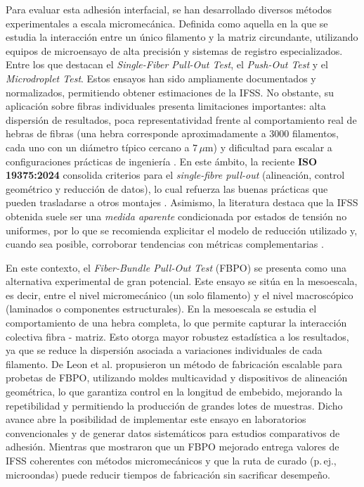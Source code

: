Para evaluar esta adhesión interfacial, se han desarrollado diversos métodos experimentales
a escala micromecánica. Definida como aquella en la que se estudia la interacción entre un
único filamento y la matriz circundante, utilizando equipos de microensayo de alta precisión
y sistemas de registro especializados. Entre los que destacan el \textit{Single-Fiber Pull-Out Test},
el \textit{Push-Out Test} y el \textit{Microdroplet Test}. Estos ensayos han sido ampliamente
documentados y normalizados, permitiendo obtener estimaciones de la IFSS. No obstante, su aplicación
sobre fibras individuales presenta limitaciones importantes: alta dispersión de resultados, poca
representatividad frente al comportamiento real de hebras de fibras (una hebra corresponde
aproximadamente a 3000 filamentos, cada uno con un diámetro típico cercano a $7\,\mu$m) y dificultad
para escalar a configuraciones prácticas de ingeniería \cite{DINSPEC19289}.
En este ámbito, la reciente \textbf{ISO 19375:2024} consolida criterios para el \textit{single-fibre
pull-out} (alineación, control geométrico y reducción de datos), lo cual refuerza las buenas prácticas
que pueden trasladarse a otros montajes \cite{ISO19375}. Asimismo, la literatura destaca que la IFSS
obtenida suele ser una \textit{medida aparente} condicionada por estados de tensión no uniformes, por lo
que se recomienda explicitar el modelo de reducción utilizado y, cuando sea posible, corroborar tendencias
con métricas complementarias \cite{Fischer2020,Liu2021}.

En este contexto, el \textit{Fiber-Bundle Pull-Out Test} (FBPO) se presenta como una alternativa
experimental de gran potencial. Este ensayo se sitúa en la mesoescala, es decir, entre el
nivel micromecánico (un solo filamento) y el nivel macroscópico (laminados o componentes
estructurales). En la mesoescala se estudia el comportamiento de una hebra completa,
lo que permite capturar la interacción colectiva fibra - matriz. Esto otorga mayor robustez
estadística a los resultados, ya que se reduce la dispersión asociada a variaciones individuales
de cada filamento. De Leon et al. \cite{DeLeon2022} propusieron un método de fabricación escalable
para probetas de FBPO, utilizando moldes multicavidad y dispositivos de alineación geométrica,
lo que garantiza control en la longitud de embebido, mejorando la repetibilidad y permitiendo la
producción de grandes lotes de muestras. Dicho avance abre la posibilidad de implementar
este ensayo en laboratorios convencionales y de generar datos sistemáticos para estudios
comparativos de adhesión. Mientras que \cite{Zhou2016} mostraron que un FBPO mejorado entrega
valores de IFSS coherentes con métodos micromecánicos y que la ruta de curado (p.\,ej.,
microondas) puede reducir tiempos de fabricación sin sacrificar desempeño.

